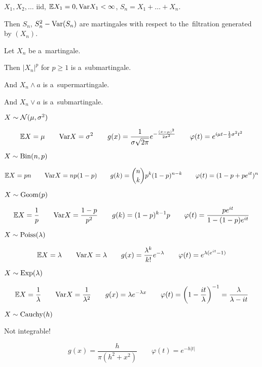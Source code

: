 	\begin{proposition}[8.5]
		$X_1, X_2, \ldots$ iid, $\mathbb{E} X_1 = 0, \mathrm{Var} X_1 < \infty$,
		$S_n = X_1 + \ldots + X_n$.
		
		Then $S_n$, $S_n^2 - \mathrm{Var}(S_n)$ are martingales with respect
		to the~filtration generated by $(X_n)$.
	\end{proposition}
	
	\begin{proposition}[9.1]
		Let $X_n$ be a~martingale.
		
		Then $|X_n|^p$ for $p \geq 1$ is a~submartingale.
		
		And $X_n \wedge a$ is a~supermartingale.
		
		And $X_n \vee a$ is a~submartingale.
	\end{proposition}

	
	\begin{proposition}
		$X \sim \mathcal{N}(\mu, \sigma^2)$
		
		$$\mathbb{E} X = \mu 
		\qquad \mathrm{Var} X = \sigma^2 
		\qquad g(x) = \frac{1}{\sigma \sqrt{2 \pi}} e^{- \frac{(x-\mu)^2}{2 \sigma^2}} 
		\qquad \varphi(t) = e^{i\mu t - \frac{1}{2} \sigma^2 t^2}$$
	\end{proposition}
	
	\begin{proposition}
		$X \sim {\mathrm{Bin}}(n,p)$
		
		$$\mathbb{E} X = pn
		\qquad \mathrm{Var} X = np(1-p)
		\qquad g(k) = \binom{n}{k} p^k (1-p)^{n-k}
		\qquad \varphi(t) = (1-p+pe^{it})^n$$
	\end{proposition}

	
	\begin{proposition}
		$X \sim {\mathrm{Geom}}(p)$
		
		$$\mathbb{E} X = \frac{1}{p}
		\qquad \mathrm{Var} X = \frac{1-p}{p^2}
		\qquad g(k) = (1-p)^{k-1} p
		\qquad \varphi(t) = \frac{p e^{it}}{1 - (1-p) e^{it}}$$
	\end{proposition}
	
	\begin{proposition}
		$X \sim {\mathrm{Poiss}}(\lambda)$
		
		$$\mathbb{E} X = \lambda
		\qquad \mathrm{Var} X = \lambda
		\qquad g(x) = \frac{\lambda^k}{k!} e^{-\lambda}
		\qquad \varphi(t) = e^{\lambda (e^{it} - 1)}$$
	\end{proposition}
	
	\begin{proposition}
		$X \sim {\mathrm{Exp}}(\lambda)$
		
		$$\mathbb{E} X = \frac{1}{\lambda}
		\qquad \mathrm{Var} X = \frac{1}{\lambda^2}
		\qquad g(x) = \lambda e^{-\lambda x}
		\qquad \varphi(t) = \left(1 - \frac{it}{\lambda}\right)^{-1} = \frac{\lambda}{\lambda - it}$$
	\end{proposition}
	
	\begin{proposition}
		$X \sim {\mathrm{Cauchy}}(h)$
		
		Not integrable!
		
		$$g(x) = \frac{h}{\pi(h^2 + x^2)}
		\qquad \varphi(t) = e^{-h|t|}$$
	\end{proposition}






 
 
